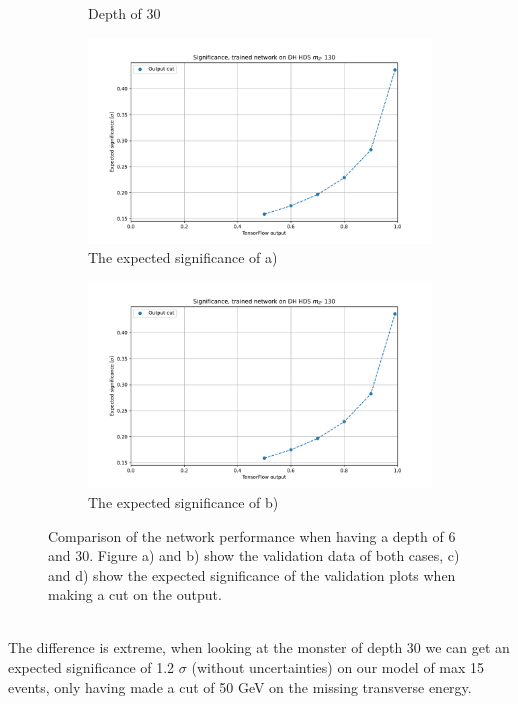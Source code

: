 \documentclass[14pt, a4paper]{book}
\begin{document}
\begin{figure}[!ht]
\begin{subfigure}[b]{0.49\textwidth}
        \caption{Depth of 30}
     \end{subfigure}
   \hfill\graphicspath{{../../../Plots/XGBoost/FULL/GRIDSEARCH_n_est_10-1000/DH_HDS_mZp_130/}}
   \begin{subfigure}[b]{0.49\textwidth}
      \centering
      \includegraphics[width=1\textwidth]{EXP_SIG.pdf}
      \caption{The expected significance of a)}
   \end{subfigure}
   \hfill\graphicspath{{../../../Plots/XGBoost/FULL/DH_HDS_mZp_130/}}
   \begin{subfigure}[b]{0.49\textwidth}
      \centering
      \includegraphics[width=1\textwidth]{EXP_SIG.pdf}
      \caption{The expected significance of b)}
   \end{subfigure}
   \caption{Comparison of the network performance when having a depth of 6 and 30. Figure a) and b) show the validation data of both cases, c) and d) show the expected significance of the validation plots when making a cut on the output. }
\end{figure}
\\The difference is extreme, when looking at the monster of depth 30 we can get an expected significance of 1.2 $\sigma$ (without uncertainties) on our model of max 15 events, only having made a cut of 50 GeV on the missing transverse energy.
\end{document}
